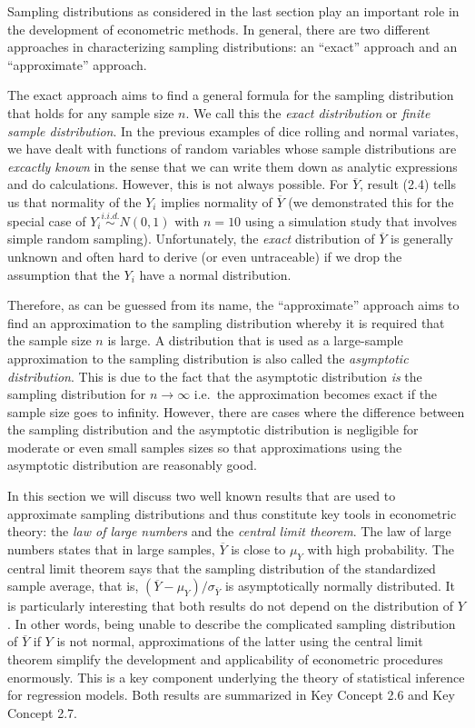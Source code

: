 \documentclass[]{book}
\theoremstyle{definition}
\theoremstyle{definition}
\theoremstyle{definition}
\theoremstyle{remark}
\begin{document}
Sampling distributions as considered in the last section play an
important role in the development of econometric methods. In general,
there are two different approaches in characterizing sampling
distributions: an ``exact'' approach and an ``approximate'' approach.

The exact approach aims to find a general formula for the sampling
distribution that holds for any sample size \(n\). We call this the
\emph{exact distribution} or \emph{finite sample distribution}. In the
previous examples of dice rolling and normal variates, we have dealt
with functions of random variables whose sample distributions are
\emph{excactly known} in the sense that we can write them down as
analytic expressions and do calculations. However, this is not always
possible. For \(\overline{Y}\), result (2.4) tells us that normality of
the \(Y_i\) implies normality of \(\overline{Y}\) (we demonstrated this
for the special case of \(Y_i \overset{i.i.d.}{\sim} N(0,1)\) with
\(n=10\) using a simulation study that involves simple random sampling).
Unfortunately, the \emph{exact} distribution of \(\overline{Y}\) is
generally unknown and often hard to derive (or even untraceable) if we
drop the assumption that the \(Y_i\) have a normal distribution.

Therefore, as can be guessed from its name, the ``approximate'' approach
aims to find an approximation to the sampling distribution whereby it is
required that the sample size \(n\) is large. A distribution that is
used as a large-sample approximation to the sampling distribution is
also called the \emph{asymptotic distribution}. This is due to the fact
that the asymptotic distribution \emph{is} the sampling distribution for
\(n \rightarrow \infty\) i.e.~the approximation becomes exact if the
sample size goes to infinity. However, there are cases where the
difference between the sampling distribution and the asymptotic
distribution is negligible for moderate or even small samples sizes so
that approximations using the asymptotic distribution are reasonably
good.

In this section we will discuss two well known results that are used to
approximate sampling distributions and thus constitute key tools in
econometric theory: the \emph{law of large numbers} and the
\emph{central limit theorem}. The law of large numbers states that in
large samples, \(\overline{Y}\) is close to \(\mu_Y\) with high
probability. The central limit theorem says that the sampling
distribution of the standardized sample average, that is,
\((\overline{Y} - \mu_Y)/\sigma_{\overline{Y}}\) is asymptotically
normally distributed. It is particularly interesting that both results
do not depend on the distribution of \(Y\). In other words, being unable
to describe the complicated sampling distribution of \(\overline{Y}\) if
\(Y\) is not normal, approximations of the latter using the central
limit theorem simplify the development and applicability of econometric
procedures enormously. This is a key component underlying the theory of
statistical inference for regression models. Both results are summarized
in Key Concept 2.6 and Key Concept 2.7.
\end{document}
